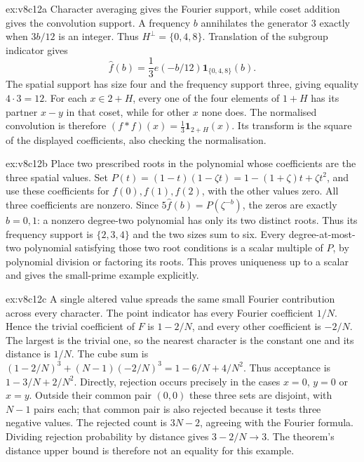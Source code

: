 \begin{solution}{ex:v8c12a}
\idea Character averaging gives the Fourier support, while coset addition gives the convolution support.
\writeup A frequency $b$ annihilates the generator $3$ exactly when $3b/12$ is an integer. Thus $H^\perp=\{0,4,8\}$. Translation of the subgroup indicator gives
\[
\hat f(b)=\frac13e(-b/12)\mathbf1_{\{0,4,8\}}(b).
\]
The spatial support has size four and the frequency support three, giving equality $4\cdot3=12$. For each $x\in2+H$, every one of the four elements of $1+H$ has its partner $x-y$ in that coset, while for other $x$ none does. The normalised convolution is therefore $(f*f)(x)=\tfrac13\mathbf1_{2+H}(x)$. Its transform is the square of the displayed coefficients, also checking the normalisation.
\end{solution}

\begin{solution}{ex:v8c12b}
\idea Place two prescribed roots in the polynomial whose coefficients are the three spatial values.
\writeup Set
$P(t)=(1-t)(1-\zeta t)=1-(1+\zeta)t+\zeta t^2$,
and use these coefficients for $f(0),f(1),f(2)$, with the other values zero. All three coefficients are nonzero. Since $5\hat f(b)=P(\zeta^{-b})$, the zeros are exactly $b=0,1$: a nonzero degree-two polynomial has only its two distinct roots. Thus its frequency support is $\{2,3,4\}$ and the two sizes sum to six. Every degree-at-most-two polynomial satisfying those two root conditions is a scalar multiple of $P$, by polynomial division or factoring its roots. This proves uniqueness up to a scalar and gives the small-prime example explicitly.
\end{solution}

\begin{solution}{ex:v8c12c}
\idea A single altered value spreads the same small Fourier contribution across every character.
\writeup The point indicator has every Fourier coefficient $1/N$. Hence the trivial coefficient of $F$ is $1-2/N$, and every other coefficient is $-2/N$. The largest is the trivial one, so the nearest character is the constant one and its distance is $1/N$.
The cube sum is $(1-2/N)^3+(N-1)(-2/N)^3=1-6/N+4/N^2$. Thus acceptance is $1-3/N+2/N^2$.
Directly, rejection occurs precisely in the cases $x=0$, $y=0$ or $x=y$. Outside their common pair $(0,0)$ these three sets are disjoint, with $N-1$ pairs each; that common pair is also rejected because it tests three negative values. The rejected count is $3N-2$, agreeing with the Fourier formula. Dividing rejection probability by distance gives $3-2/N\to3$. The theorem's distance upper bound is therefore not an equality for this example.
\end{solution}

